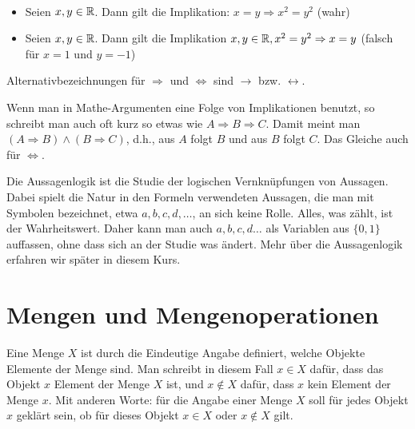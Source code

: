 \begin{bsp}\
	\begin{itemize}
		\item Seien $ x,y \in \mathbb{R}$. Dann gilt die Implikation: $x = y \Rightarrow x^2 = y^2 $ (wahr)
		\item Seien $x,y \in \mathbb{R}$. Dann gilt die Implikation $ x,y \in \mathbb{R}, x^2 = y^2 \Rightarrow x = y $ (falsch für $x=1$ und $y=-1$)	
	\end{itemize}
\end{bsp}

\begin{bem}
	Alternativbezeichnungen für $\Rightarrow$ und $\Leftrightarrow$ sind $\rightarrow$ bzw. $\leftrightarrow$. 
\end{bem} 

\begin{bem}
	Wenn man in Mathe-Argumenten eine Folge von Implikationen benutzt, so schreibt man auch oft kurz so etwas wie $A \Rightarrow B \Rightarrow C$. Damit meint man  $(A \Rightarrow B) \wedge (B \Rightarrow C)$, d.h., aus $A$ folgt $B$ und aus $B$ folgt $C$. Das Gleiche auch für $\Leftrightarrow$. 
\end{bem} 


\begin{bem}
	Die Aussagenlogik ist die Studie der logischen Vernknüpfungen von Aussagen. Dabei spielt die Natur in den Formeln verwendeten Aussagen, die man mit Symbolen bezeichnet, etwa $a,b, c, d, \ldots$, an sich keine Rolle. Alles, was zählt, ist der Wahrheitswert. Daher kann man auch $a,b,c,d \ldots$ als Variablen aus $\{0,1\}$ auffassen, ohne dass sich an der Studie was ändert. Mehr über die Aussagenlogik erfahren wir später in diesem Kurs. 
\end{bem} 

\clearpage
\section{Mengen und Mengenoperationen}


\begin{defn}
	Eine Menge $X$ ist durch die Eindeutige Angabe definiert, welche Objekte Elemente der Menge sind. Man schreibt in diesem Fall $x \in X$ dafür, dass das Objekt $x$ Element der Menge $X$ ist, und $x \not\in X$ dafür, dass $x$ kein Element der Menge $x$. Mit anderen Worte: für die Angabe einer Menge $X$ soll für jedes Objekt $x$ geklärt sein, ob für dieses Objekt $x \in X$ oder $x\not \in X$ gilt. 
\end{defn} 

